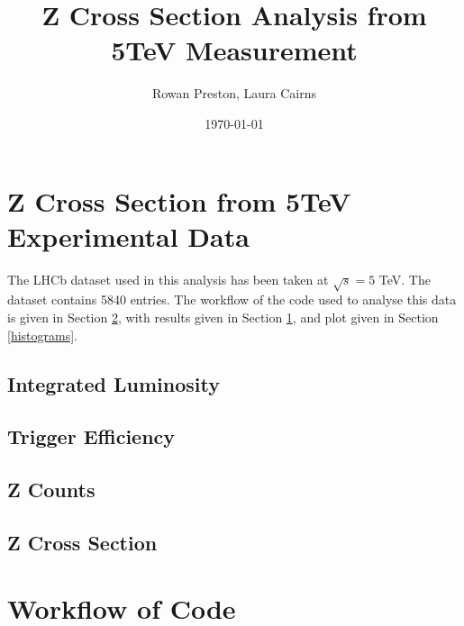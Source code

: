 \documentclass[a4paper]{article}
\title{Z Cross Section Analysis from 5TeV Measurement}
\author{Rowan Preston, Laura Cairns}
\date{\today}
\begin{document}
\maketitle


\section{Z Cross Section from 5TeV Experimental Data} \label{results}

The LHCb dataset used in this analysis has been taken at $\sqrt{s} = 5$ TeV. The dataset contains 5840 entries. The workflow of the code used to analyse this data is given in Section \ref{workflow}, with results given in Section \ref{results}, and plot given in Section \ref{histograms}.

\subsection{Integrated Luminosity} \label{lumi_val}


\subsection{Trigger Efficiency} \label{trigger_val}


\subsection{Z Counts} \label{counts_val}


\subsection{Z Cross Section} \label{xsec_val}



\section{Workflow of Code} \label{workflow}
\end{document}
